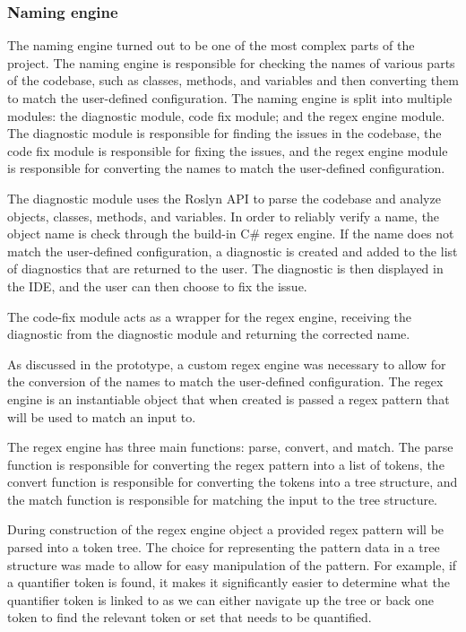 \subsubsection{Naming engine}

The naming engine turned out to be one of the most complex parts of the project. The naming engine is responsible for checking the names of various parts of the codebase, such as classes, methods, and variables and then converting them to match the user-defined configuration. The naming engine is split into multiple modules: the diagnostic module, code fix module; and the regex engine module. The diagnostic module is responsible for finding the issues in the codebase, the code fix module is responsible for fixing the issues, and the regex engine module is responsible for converting the names to match the user-defined configuration.

The diagnostic module uses the Roslyn API to parse the codebase and analyze objects, classes, methods, and variables. In order to reliably verify a name, the object name is check through the build-in C\# regex engine. If the name does not match the user-defined configuration, a diagnostic is created and added to the list of diagnostics that are returned to the user. The diagnostic is then displayed in the IDE, and the user can then choose to fix the issue.

The code-fix module acts as a wrapper for the regex engine, receiving the diagnostic from the diagnostic module and returning the corrected name.

As discussed in the prototype, a custom regex engine was necessary to allow for the conversion of the names to match the user-defined configuration. The regex engine is an instantiable object that when created is passed a regex pattern that will be used to match an input to.

The regex engine has three main functions: parse, convert, and match. The parse function is responsible for converting the regex pattern into a list of tokens, the convert function is responsible for converting the tokens into a tree structure, and the match function is responsible for matching the input to the tree structure.

During construction of the regex engine object a provided regex pattern will be parsed into a token tree. The choice for representing the pattern data in a tree structure was made to allow for easy manipulation of the pattern. For example, if a quantifier token is found, it makes it significantly easier to determine what the quantifier token is linked to as we can either navigate up the tree or back one token to find the relevant token or set that needs to be quantified.

